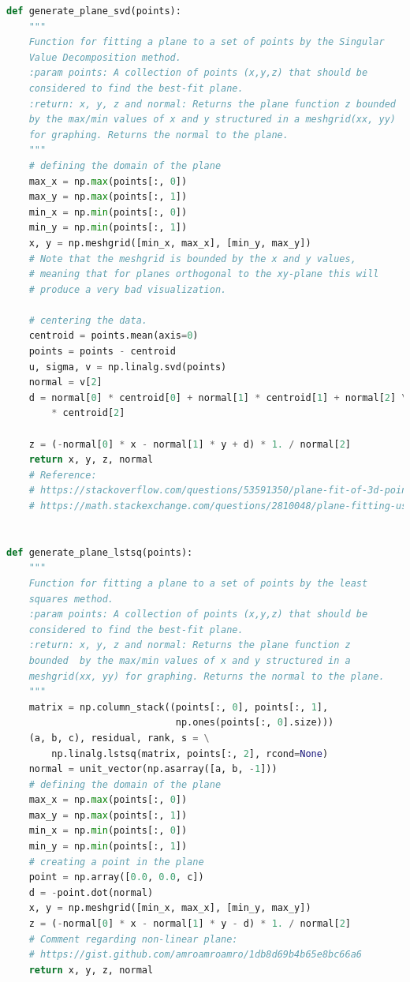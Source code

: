\documentclass[%
]{USN-MSc}
\begin{document}
\begin{lstlisting}[language=Python, caption=Methods implemented in code, label={lst:Methods}]
def generate_plane_svd(points):
    """
    Function for fitting a plane to a set of points by the Singular 
    Value Decomposition method.
    :param points: A collection of points (x,y,z) that should be
    considered to find the best-fit plane.
    :return: x, y, z and normal: Returns the plane function z bounded 
    by the max/min values of x and y structured in a meshgrid(xx, yy)
    for graphing. Returns the normal to the plane.
    """
    # defining the domain of the plane
    max_x = np.max(points[:, 0])
    max_y = np.max(points[:, 1])
    min_x = np.min(points[:, 0])
    min_y = np.min(points[:, 1])
    x, y = np.meshgrid([min_x, max_x], [min_y, max_y])  
    # Note that the meshgrid is bounded by the x and y values, 
    # meaning that for planes orthogonal to the xy-plane this will 
    # produce a very bad visualization.

    # centering the data.
    centroid = points.mean(axis=0)
    points = points - centroid
    u, sigma, v = np.linalg.svd(points)
    normal = v[2]
    d = normal[0] * centroid[0] + normal[1] * centroid[1] + normal[2] \
        * centroid[2]

    z = (-normal[0] * x - normal[1] * y + d) * 1. / normal[2]
    return x, y, z, normal
    # Reference:
    # https://stackoverflow.com/questions/53591350/plane-fit-of-3d-points-with-singular-value-decomposition
    # https://math.stackexchange.com/questions/2810048/plane-fitting-using-svd-normal-vector


def generate_plane_lstsq(points):
    """
    Function for fitting a plane to a set of points by the least  
    squares method.
    :param points: A collection of points (x,y,z) that should be
    considered to find the best-fit plane.
    :return: x, y, z and normal: Returns the plane function z 
    bounded  by the max/min values of x and y structured in a 
    meshgrid(xx, yy) for graphing. Returns the normal to the plane.
    """
    matrix = np.column_stack((points[:, 0], points[:, 1], 
                              np.ones(points[:, 0].size)))
    (a, b, c), residual, rank, s = \
        np.linalg.lstsq(matrix, points[:, 2], rcond=None)
    normal = unit_vector(np.asarray([a, b, -1]))
    # defining the domain of the plane
    max_x = np.max(points[:, 0])
    max_y = np.max(points[:, 1])
    min_x = np.min(points[:, 0])
    min_y = np.min(points[:, 1])
    # creating a point in the plane
    point = np.array([0.0, 0.0, c])
    d = -point.dot(normal)
    x, y = np.meshgrid([min_x, max_x], [min_y, max_y])
    z = (-normal[0] * x - normal[1] * y - d) * 1. / normal[2]
    # Comment regarding non-linear plane:
    # https://gist.github.com/amroamroamro/1db8d69b4b65e8bc66a6
    return x, y, z, normal



\end{lstlisting}
\end{document}
